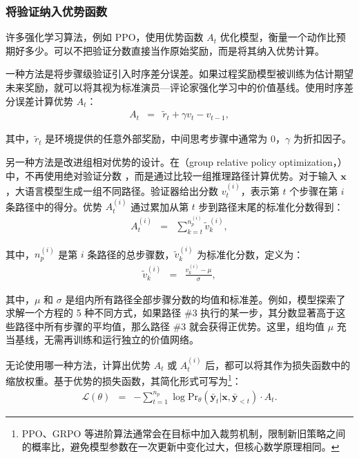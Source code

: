 \subsubsection{将验证纳入优势函数}

许多强化学习算法，例如 PPO，使用优势函数 $A_t$ 优化模型，衡量一个动作比预期好多少。可以不把验证分数直接当作原始奖励，而是将其纳入优势计算。

一种方法是将步骤级验证引入时序差分误差。如果过程奖励模型被训练为估计期望未来奖励，就可以将其视为标准演员—评论家强化学习中的价值基线。使用时序差分误差计算优势 $A_t$：
\begin{eqnarray}
A_t & = & \tilde{r}_{t} + \gamma v_t - v_{t-1},
\end{eqnarray}

\noindent 其中，$\tilde{r}_{t}$ 是环境提供的任意外部奖励，中间思考步骤中通常为 $0$，$\gamma$ 为折扣因子。

另一种方法是改进组相对优势的设计。在（group relative policy optimization，）中，不再使用绝对验证分数 \cite{shao-etal:2024deepseekmath}，而是通过比较一组推理路径计算优势。对于输入 $\mathbf{x}$，大语言模型生成一组不同路径。验证器给出分数 $v_t^{(i)}$，表示第 $t$ 个步骤在第 $i$ 条路径中的得分。优势 $A_t^{(i)}$ 通过累加从第 $t$ 步到路径末尾的标准化分数得到：
\begin{eqnarray}
A_t^{(i)} & = & \sum_{k = t}^{n_p^{(i)}} \tilde{v}_k^{(i)},
\end{eqnarray}

\noindent 其中，$n_p^{(i)}$ 是第 $i$ 条路径的总步骤数，$\tilde{v}_k^{(i)}$ 为标准化分数，定义为：
\begin{eqnarray}
\tilde{v}_k^{(i)} & = & \frac{v_k^{(i)} - \mu}{\sigma},
\end{eqnarray}

\noindent 其中，$\mu$ 和 $\sigma$ 是组内所有路径全部步骤分数的均值和标准差。例如，模型探索了求解一个方程的 5 种不同方式，如果路径 \#3 执行的某一步，其分数显著高于这些路径中所有步骤的平均值，那么路径 \#3 就会获得正优势。这里，组均值 $\mu$ 充当基线，无需再训练和运行独立的价值网络。


无论使用哪一种方法，计算出优势 $A_t$ 或 $A_t^{(i)}$ 后，都可以将其作为损失函数中的缩放权重。基于优势的损失函数，其简化形式可写为\footnote{PPO、GRPO 等进阶算法通常会在目标中加入裁剪机制，限制新旧策略之间的概率比，避免模型参数在一次更新中变化过大，但核心数学原理相同。}：
\begin{eqnarray}
\mathcal{L}(\theta) & = & - \sum_{t=1}^{n_p} \log \mathrm{Pr}_{\theta}(\bar{\mathbf{y}}_t | \mathbf{x}, \bar{\mathbf{y}}_{<t}) \cdot A_t.
\end{eqnarray}

